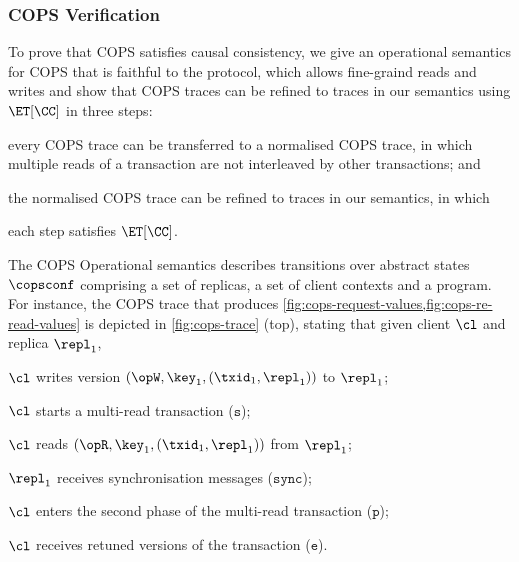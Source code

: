 \subsubsection{COPS Verification} To prove that COPS satisfies causal consistency,
we give an operational semantics for COPS that is faithful to the protocol, which allows fine-graind reads and writes
and show that COPS traces can be refined to traces in our semantics using \( \ET[\CC] \) in three steps:
\begin{enumerate*}
\item every COPS trace can be transferred to a normalised COPS trace, 
in which multiple reads of a transaction are not interleaved by other transactions; and
\item the normalised COPS trace can be refined to traces in our semantics, in which \item each step satisfies \( \ET[\CC] \).
\end{enumerate*}

The COPS Operational semantics
describes transitions over abstract states \( \copsconf \) comprising a set of replicas,
a set of client contexts and a program.
For instance, the COPS trace that produces \cref{fig:cops-request-values,fig:cops-re-read-values} is depicted in \cref{fig:cops-trace} (top), stating that
given client \(\cl\) and replica \( \repl_1 \),
\begin{enumerate*}
\item \( \cl \) writes version \( (\opW,\key_1, (\txid_1,\repl_1)) \) to $\repl_1$;
\item \( \cl \) starts a multi-read transaction (\( \mathtt{s} \));
\item \( \cl \) reads  \( (\opR,\key_1, (\txid_1,\repl_1)) \) from $\repl_1$;
\item \( \repl_1 \) receives synchronisation messages (\(\mathtt{sync}\));
\item \( \cl \) enters the second phase of the multi-read transaction (\(\mathtt{p}\));
\item \( \cl \) receives retuned versions of the transaction (\(\mathtt{e}\)).
\end{enumerate*}



